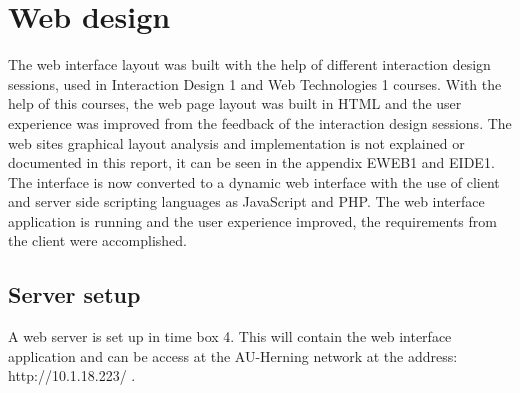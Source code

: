 \chapter{Web design}
The web interface layout was built with the help of different interaction design sessions, used in Interaction Design 1 and Web Technologies 1 courses. With the help of this courses, the web page layout was built in HTML and the user experience was improved from the feedback of the interaction design sessions. The web sites graphical layout analysis and implementation is not explained or documented in this report, it can be seen in the appendix EWEB1 and EIDE1.
\p
The interface is now converted to a dynamic web interface with the use of client and server side scripting languages as JavaScript and PHP. The web interface application is running and the user experience improved, the requirements from the client were accomplished.
%
\section{Server setup}
A web server is set up in time box 4. This will contain the web interface application and can be access at the AU-Herning network at the address: http://10.1.18.223/ .

